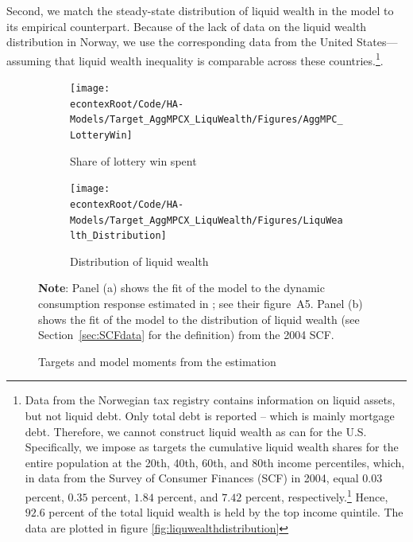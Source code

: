 \documentclass[\econtexRoot/EGMN]{subfiles}
\begin{document}
Second, we match the steady-state distribution of liquid wealth in the model to its empirical counterpart. Because of the lack of data on the liquid wealth distribution in Norway, we use the corresponding data from the United States---assuming that liquid wealth inequality is comparable across these countries.\footnote{Data from the Norwegian tax registry contains information on liquid assets, but not liquid debt. Only total debt is reported -- which is mainly mortgage debt. Therefore, we cannot construct liquid wealth as \citet{kaplan2014model} can for the U.S. \notinsubfile{\label{foot:liqwealth}} Specifically, we impose as targets the cumulative liquid wealth shares for the entire population at the 20th, 40th, 60th, and 80th income percentiles, which, in data from the Survey of Consumer Finances (SCF) in 2004, equal $0.03$ percent, $0.35$ percent, $1.84$ percent, and $7.42$ percent, respectively.\footnote{See section~\ref{sec:SCFdata} for details.} Hence, $92.6$ percent of the total liquid wealth is held by the top income quintile. The data are plotted in figure \ref{fig:liquwealthdistribution}}.

\begin{figure}[htb]
    \centering
    \begin{subfigure}[b]{.48\linewidth}
        \centering
        \texttt{[image: \\econtexRoot/Code/HA-Models/Target\_AggMPCX\_LiquWealth/Figures/AggMPC\_LotteryWin]}
        \caption{Share of lottery win spent}
        \notinsubfile{\label{fig:aggmpclotterywin}}
    \end{subfigure}
    \begin{subfigure}[b]{.48\linewidth}
        \centering
        \texttt{[image: \\econtexRoot/Code/HA-Models/Target\_AggMPCX\_LiquWealth/Figures/LiquWealth\_Distribution]}
        \caption{Distribution of liquid wealth}
        \notinsubfile{\label{fig:liquwealthdistribution}}
    \end{subfigure}%
    \caption{Targets and model moments from the estimation}
    \notinsubfile{\label{fig:splurge_estimation}}
    \parbox{16cm}{\small \vspace{.15cm} \textbf{Note}: Panel (a) shows the fit of the model to the dynamic consumption response estimated in \citet{fagereng_mpc_2021}; see their figure~A5. Panel (b) shows the fit of the model to the distribution of liquid wealth (see Section~\ref{sec:SCFdata} for the definition) from the 2004 SCF.\normalsize}
\end{figure}
\end{document}
